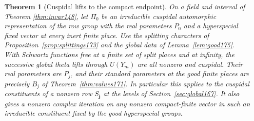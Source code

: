 \documentclass[a4paper,11pt]{article}
\newtheorem{theorem}[proposition]{Theorem}
\theoremstyle{definition}
\theoremstyle{remark}
\numberwithin{equation}{section}
\begin{document}
\begin{theorem}[Cuspidal lifts to the compact endpoint]
\label{thm:global175}
On a field and interval of Theorem \ref{thm:invar148}, let
\(\Pi_0\) be an irreducible cuspidal automorphic representation
of the row group with the real parameters \(P_0\) and a
hyperspecial fixed vector at every inert finite place.
Use the splitting characters of Proposition~\ref{prop:splittings173}
and the global data of Lemma~\ref{lem:good175}. With
Schwartz functions free at a finite set of split places and
at infinity, the successive global theta lifts through
\(U(Y_m)\) are all nonzero and cuspidal. Their real parameters
are \(P_j\), and their standard parameters at the good finite
places are precisely \(B_j\) of Theorem~\ref{thm:values171}.
In particular this applies to the cuspidal constituents of a
nonzero row \(S_{\boldsymbol j}\) at the levels of
Section~\ref{sec:global167}. It also gives a nonzero complex
iteration on any nonzero compact-finite vector in such an
irreducible constituent fixed by the good hyperspecial groups.
\end{theorem}
\end{document}
